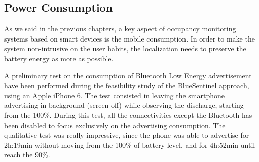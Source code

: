 


\subsection{Power Consumption}
\label{sec:test-consumption}

As we said in the previous chapters, a key aspect of occupancy monitoring systems based on smart devices is the mobile consumption. In order to make the system non-intrusive on the user habits, the localization needs to preserve the battery energy as more as possible.

A preliminary test on the consumption of Bluetooth Low Energy advertisement have been performed during the feasibility study of the BlueSentinel approach, using an Apple iPhone 6. The test consisted in leaving the smartphone advertising in background (screen off) while observing the discharge, starting from the 100\%. During this test, all the connectivities except the Bluetooth has been disabled to focus exclusively on the advertising consumption. The qualitative test was really impressive, since the phone was able to advertise for 2h:19min without moving from the 100\% of battery level, and for 4h:52min until reach the 90\%.
\smallskip

